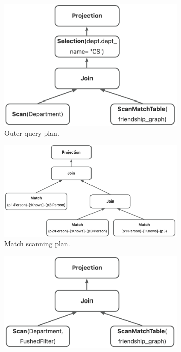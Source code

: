 \begin{figure}
    \centering
    \begin{subfigure}[b]{0.4\linewidth}
        \centering
        \includegraphics[width=\linewidth]{./figures/converged-logical-plan-relational.png}
        \caption{Outer query plan.}
        \label{fig:converged-logical-plan-relational}
    \end{subfigure}
    \begin{subfigure}[b]{0.4\linewidth}
        \centering
        \includegraphics[width=\linewidth]{./figures/converged-logical-plan-graph.png}
        \caption{Match scanning plan.}
        \label{fig:converged-logical-plan-graph}
    \end{subfigure}
    \begin{subfigure}[b]{0.4\linewidth}
        \centering
        \includegraphics[width=\linewidth]{./figures/converged-logical-plan-relational-optimized.png}

\end{subfigure}
\end{figure}
